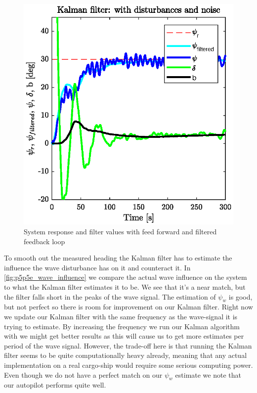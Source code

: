 \begin{figure}[h]
	\centering
	\includegraphics[width=\textwidth]{figures/p5p5e.eps}
	\caption{System response and filter values with feed forward and filtered feedback loop}
\label{fig:p5p5e_system_response}
\end{figure}


To smooth out the measured heading the Kalman filter has to estimate the influence the wave disturbance has on it and counteract it. In \cref{fig:p5p5e_wave_influence} we compare the actual wave influence on the system to what the Kalman filter estimates it to be. We see that it's a near match, but the filter falls short in the peaks of the wave signal. The estimation of $\psi_w$ is good, but not perfect so there is room for improvement on our Kalman filter. Right now we update our Kalman filter with the same frequency as the wave-signal it is trying to estimate. By increasing the frequency we run our Kalman algorithm with we might get better results as this will cause us to get more estimates per period of the wave signal. However, the trade-off here is that running the Kalman filter seems to be quite computationally heavy already, meaning that any actual implementation on a real cargo-ship would require some serious computing power. Even though we do not have a perfect match on our $\psi_w$ estimate we note that our autopilot performs quite well.


